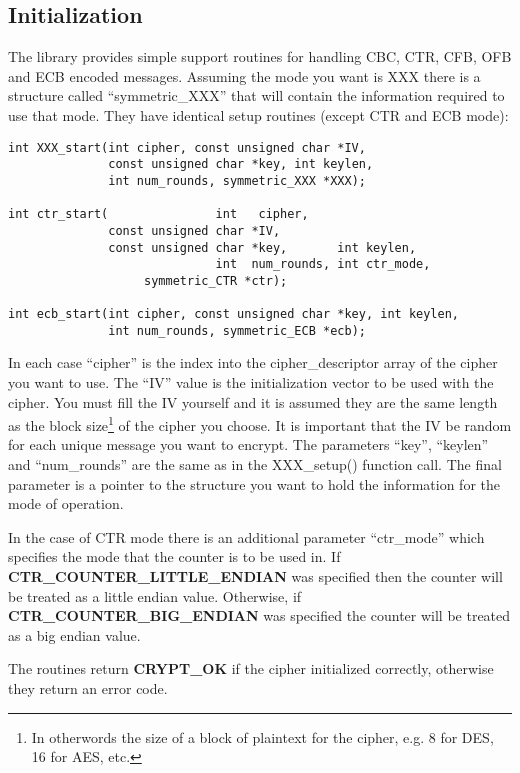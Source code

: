 \documentclass[a4paper]{book}
\begin{document}
\subsection{Initialization}
 
 
The library provides simple support routines for handling CBC, CTR, CFB, OFB and ECB encoded messages.  Assuming the mode 
you want is XXX there is a structure called ``symmetric\_XXX'' that will contain the information required to
use that mode.  They have identical setup routines (except CTR and ECB mode):
    
\begin{verbatim}
int XXX_start(int cipher, const unsigned char *IV, 
              const unsigned char *key, int keylen, 
              int num_rounds, symmetric_XXX *XXX);

int ctr_start(               int   cipher,
              const unsigned char *IV,
              const unsigned char *key,       int keylen,
                             int  num_rounds, int ctr_mode,
                   symmetric_CTR *ctr);

int ecb_start(int cipher, const unsigned char *key, int keylen, 
              int num_rounds, symmetric_ECB *ecb);
\end{verbatim}

In each case ``cipher'' is the index into the cipher\_descriptor array of the cipher you want to use.  The ``IV'' value is 
the initialization vector to be used with the cipher.  You must fill the IV yourself and it is assumed they are the same 
length as the block size\footnote{In otherwords the size of a block of plaintext for the cipher, e.g. 8 for DES, 16 for AES, etc.} 
of the cipher you choose.  It is important that the IV  be random for each unique message you want to encrypt.  The 
parameters ``key'', ``keylen'' and ``num\_rounds'' are the same as in the XXX\_setup() function call.  The final parameter 
is a pointer to the structure you want to hold the information for the mode of operation.


In the case of CTR mode there is an additional parameter ``ctr\_mode'' which specifies the mode that the counter is to be used in.
If \textbf{CTR\_COUNTER\_LITTLE\_ENDIAN} was specified then the counter will be treated as a little endian value.  Otherwise, if 
\textbf{CTR\_COUNTER\_BIG\_ENDIAN} was specified the counter will be treated as a big endian value.

The routines return {\bf CRYPT\_OK} if the cipher initialized correctly, otherwise they return an error code.  
\end{document}

